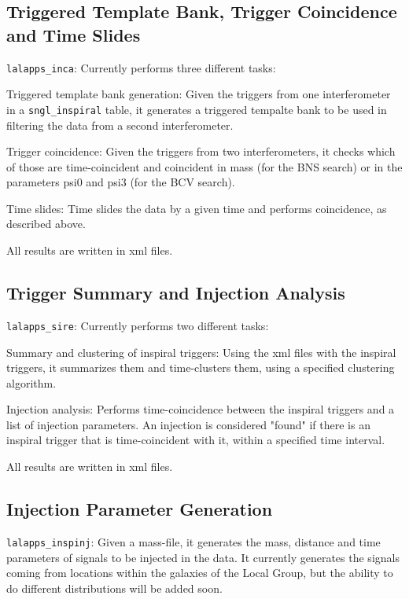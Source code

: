 \subsection{Triggered Template Bank, Trigger Coincidence and Time Slides}

\texttt{lalapps\_inca}: Currently performs three different tasks:

Triggered template bank generation: Given the triggers from one interferometer
in a \verb$sngl_inspiral$ table, it generates a triggered tempalte bank to be
used in filtering the data from a second interferometer. 

Trigger coincidence: Given the triggers from two interferometers, it checks
which of those are time-coincident and coincident in mass (for the BNS search)
or in the parameters psi0 and psi3 (for the BCV search).

Time slides: Time slides the data by a given time and performs coincidence,
as described above.

All results are written in xml files.


\subsection{Trigger Summary and Injection Analysis}

\texttt{lalapps\_sire}: Currently performs two different tasks:

Summary and clustering of inspiral triggers: Using the xml files with the
inspiral triggers, it summarizes them and time-clusters them, using a
specified clustering algorithm.

Injection analysis: Performs time-coincidence between  the inspiral triggers 
and a list of injection parameters. An injection is considered "found" if
there is an inspiral trigger that is time-coincident with it, within a 
specified time interval.

All results are written in xml files.

\subsection{Injection Parameter Generation}

\texttt{lalapps\_inspinj}: Given a mass-file, it generates the mass,
  distance and time parameters of signals to be injected in the data.
  It currently generates the signals coming from locations within the
  galaxies of the Local Group, but the ability to do different distributions
  will be added soon.

